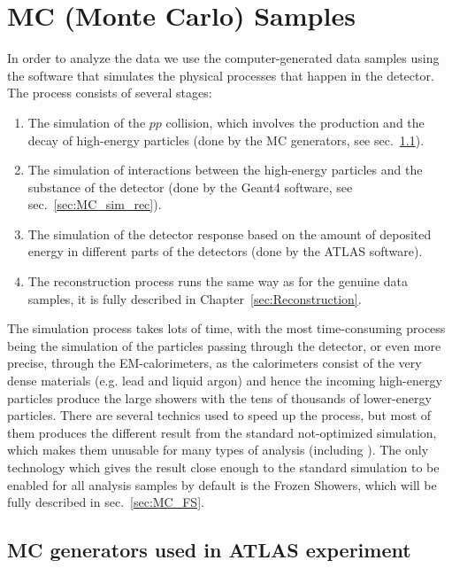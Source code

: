 \chapter{MC (Monte Carlo) Samples}
\label{sec:MCSamples}

In order to analyze the data we use the computer-generated data samples using the software that simulates the physical processes that happen in the detector. The process consists of several stages:
\begin{enumerate}
\item The simulation of the $pp$ collision, which involves the production and the decay of high-energy particles (done by the MC generators, see sec.~\ref{sec:MC_gen}).
\item The simulation of interactions between the high-energy particles and the substance of the detector (done by the Geant4 software, see sec.~\ref{sec:MC_sim_rec}).
\item The simulation of the detector response based on the amount of deposited energy in different parts of the detectors (done by the ATLAS software).
\item The reconstruction process runs the same way as for the genuine data samples, it is fully described in Chapter~\ref{sec:Reconstruction}.
\end{enumerate}
The simulation process takes lots of time, with the most time-consuming process being the simulation of the particles passing through the detector, or even more precise, through the EM-calorimeters, as the calorimeters consist of the very dense materials (e.g. lead and liquid argon) and hence the incoming high-energy particles produce the large showers with the tens of thousands of lower-energy particles. There are several technics used to speed up the process, but most of them produces the different result from the standard not-optimized simulation, which makes them unusable for many types of analysis (including \Zee). The only technology which gives the result close enough to the standard simulation to be enabled for all analysis samples by default is the Frozen Showers, which will be fully described in sec.~\ref{sec:MC_FS}.

\section{MC generators used in ATLAS experiment}
\label{sec:MC_gen}

